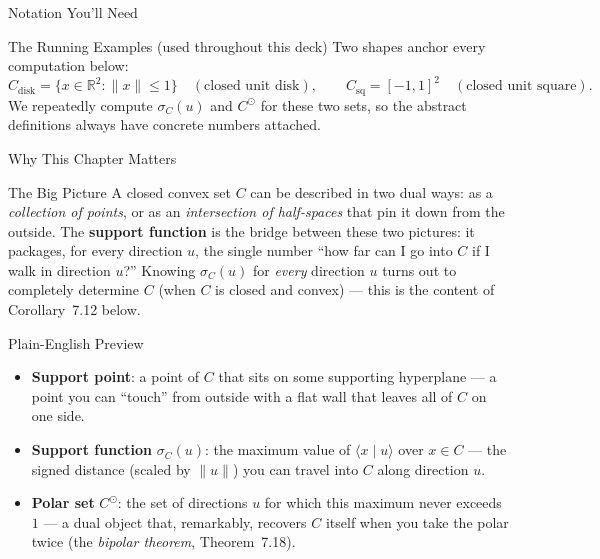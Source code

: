 \documentclass[aspectratio=169,10pt]{beamer}
\newcommand{\R}{\mathbb{R}}
\newcommand{\ip}[2]{\langle #1 \mid #2 \rangle}
\begin{document}
\begin{frame}[allowframebreaks]{Notation You'll Need}
  \begin{alertblock}{The Running Examples (used throughout this deck)}
    Two shapes anchor every computation below:
    \[
      C_{\mathrm{disk}} = \{x \in \R^2 : \|x\| \le 1\} \quad (\text{closed
      unit disk}), \qquad C_{\mathrm{sq}} = [-1,1]^2 \quad (\text{closed unit
      square}).
    \]
    We repeatedly compute $\sigma_{C}(u)$ and $C^\odot$ for these two sets, so
    the abstract definitions always have concrete numbers attached.
  \end{alertblock}

\end{frame}

\begin{frame}{Why This Chapter Matters}

  \begin{block}{The Big Picture}
    A closed convex set $C$ can be described in two dual ways: as a
    \emph{collection of points}, or as an \emph{intersection of half-spaces}
    that pin it down from the outside. The \textbf{support function} is the
    bridge between these two pictures: it packages, for every direction $u$,
    the single number ``how far can I go into $C$ if I walk in direction
    $u$?'' Knowing $\sigma_C(u)$ for \emph{every} direction $u$ turns out to
    completely determine $C$ (when $C$ is closed and convex) --- this is the
    content of Corollary~7.12 below.
  \end{block}

  \begin{block}{Plain-English Preview}
    \begin{itemize}
      \item \textbf{Support point}: a point of $C$ that sits on some
        supporting hyperplane --- a point you can ``touch'' from outside
        with a flat wall that leaves all of $C$ on one side.
      \item \textbf{Support function} $\sigma_C(u)$: the maximum value of
        $\ip{x}{u}$ over $x \in C$ --- the signed distance (scaled by
        $\|u\|$) you can travel into $C$ along direction $u$.
      \item \textbf{Polar set} $C^\odot$: the set of directions $u$ for which
        this maximum never exceeds $1$ --- a dual object that, remarkably,
        recovers $C$ itself when you take the polar twice (the
        \emph{bipolar theorem}, Theorem~7.18).
    \end{itemize}
  \end{block}

\end{frame}
\end{document}
